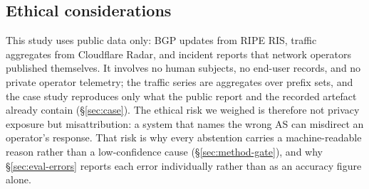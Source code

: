 \subsection{Ethical considerations}
\label{sec:ethics}

This study uses public data only: BGP updates from RIPE RIS, traffic
aggregates from Cloudflare Radar, and incident reports that network
operators published themselves. It involves no human subjects, no
end-user records, and no private operator telemetry; the traffic series
are aggregates over prefix sets, and the case study reproduces only what
the public report and the recorded artefact already contain
(\S\ref{sec:case}). The ethical risk we weighed is therefore not privacy
exposure but misattribution: a system that names the wrong AS can
misdirect an operator's response. That risk is why every abstention
carries a machine-readable reason rather than a low-confidence cause
(\S\ref{sec:method-gate}), and why \S\ref{sec:eval-errors} reports each
error individually rather than as an accuracy figure alone.
